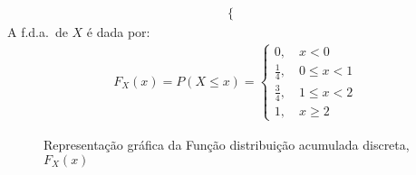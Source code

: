 \begin{description}
\begin{align*}
\begin{cases}
           \end{cases}
         \end{align*}
         A f.d.a.\ de $X$ é dada por:
         \begin{align*}
           F_{X}(x)=P(X\le x)= 
           \begin{cases}
             0,\quad  x<0 \\
             \frac{1}{4}, \quad 0 \le x <1\\
             \frac{3}{4}, \quad 1 \le x < 2\\
             1, \quad x \geq 2
           \end{cases}
         \end{align*}

         \begin{figure}[H]
           \centering
           
           \caption{Representação gráfica da Função distribuição acumulada discreta, $F_{X}(x)$}
           \label{fig:}
         \end{figure}
     \end{description}
